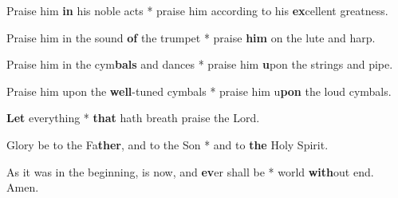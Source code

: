 \begin{multicols}{2}
	Praise him \textbf{in} his noble acts * praise him according to his \textbf{ex}cellent greatness.
	
	Praise him in the sound \textbf{of} the trumpet * praise \textbf{him} on the lute and harp.
	
	Praise him in the cym\textbf{bals} and dances * praise him \textbf{u}pon the strings and pipe.
	
	Praise him upon the \textbf{well}-tuned cymbals * praise him u\textbf{pon} the loud cymbals.
	
	\textbf{Let} everything * \textbf{that} hath breath praise the Lord.
	
	Glory be to the Fa\textbf{ther}, and to the Son * and to \textbf{the} Holy Spirit.
	
	As it was in the beginning, is now, and \textbf{ev}er shall be * world \textbf{with}out end. Amen.
\end{multicols}